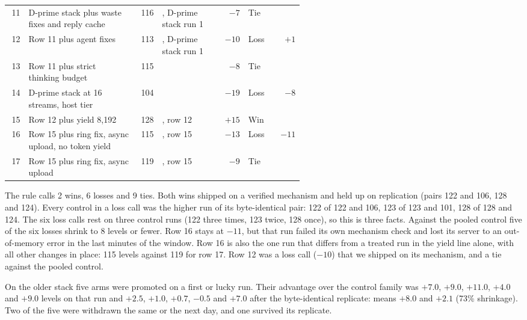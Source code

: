 \begin{table}[!htb]
{\begin{tabular}{@{}r>{\raggedright\arraybackslash}p{0.37\linewidth}r>{\raggedright\arraybackslash}p{0.20\linewidth}rlr@{}}
11 & D-prime stack plus waste fixes and reply cache & 116 & 123, D-prime stack run 1 & $-7$ & Tie & \\ %
12 & Row 11 plus agent fixes & 113 & 123, D-prime stack run 1 & $-10$ & Loss & $+1$ \\ %
13 & Row 11 plus strict thinking budget & 115 & 123 & $-8$ & Tie & \\ %
14 & D-prime stack at 16 streams, host tier & 104 & 123 & $-19$ & Loss & $-8$ \\ %
15 & Row 12 plus yield 8,192 & 128 & 113, row 12 & $+15$ & Win & \\ %
16 & Row 15 plus ring fix, async upload, no token yield & 115 & 128, row 15 & $-13$ & Loss & $-11$ \\ %
17 & Row 15 plus ring fix, async upload & 119 & 128, row 15 & $-9$ & Tie & \\ %
\bottomrule
\end{tabular}}
\end{table}

The rule calls 2 wins, 6 losses and 9 ties. %
Both wins shipped on a verified mechanism and held up on replication (pairs 122 and 106, 128 and 124). %
Every control in a loss call was the higher run of its byte-identical pair: 122 of 122 and 106, 123 of 123 and 101, 128 of 128 and 124. The six loss calls rest on three control runs (122 three times, 123 twice, 128 once), so this is three facts. %
Against the pooled control five of the six losses shrink to 8 levels or fewer. Row 16 stays at $-11$, but that run failed its own mechanism check and lost its server to an out-of-memory error in the last minutes of the window. %
Row 16 is also the one run that differs from a treated run in the yield line alone, with all other changes in place: 115 levels against 119 for row 17. %
Row 12 was a loss call ($-10$) that we shipped on its mechanism, and a tie against the pooled control. %

On the older stack five arms were promoted on a first or lucky run. Their advantage over the control family was $+7.0$, $+9.0$, $+11.0$, $+4.0$ and $+9.0$ levels on that run and $+2.5$, $+1.0$, $+0.7$, $-0.5$ and $+7.0$ after the byte-identical replicate: means $+8.0$ and $+2.1$ (73\% shrinkage). %
Two of the five were withdrawn the same or the next day, and one survived its replicate. %


